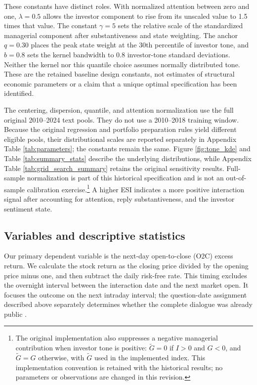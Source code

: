 \documentclass[12pt]{article}
\begin{document}
These constants have distinct roles. With normalized attention between zero and one, $\lambda=0.5$ allows the investor component to rise from its unscaled value to 1.5 times that value. The constant $\gamma=5$ sets the relative scale of the standardized managerial component after substantiveness and state weighting. The anchor $q=0.30$ places the peak state weight at the 30th percentile of investor tone, and $b=0.8$ sets the kernel bandwidth to 0.8 investor-tone standard deviations. Neither the kernel nor this quantile choice assumes normally distributed tone. These are the retained baseline design constants, not estimates of structural economic parameters or a claim that a unique optimal specification has been identified.

The centering, dispersion, quantile, and attention normalization use the full original 2010--2024 text pools. They do not use a 2010--2018 training window. Because the original regression and portfolio preparation rules yield different eligible pools, their distributional scales are reported separately in Appendix Table \ref{tab:parameters}; the constants remain the same. Figure \ref{fig:tone_kde} and Table \ref{tab:summary_stats} describe the underlying distributions, while Appendix Table \ref{tab:grid_search_summary} retains the original sensitivity results. Full-sample normalization is part of this historical specification and is not an out-of-sample calibration exercise.\footnote{The original implementation also suppresses a negative managerial contribution when investor tone is positive: $\widetilde G=0$ if $I>0$ and $G<0$, and $\widetilde G=G$ otherwise, with $\widetilde G$ used in the implemented index. This implementation convention is retained with the historical results; no parameters or observations are changed in this revision.}
 A higher ESI indicates a more positive interaction signal after accounting for attention, reply substantiveness, and the investor sentiment state.

\subsection{Variables and descriptive statistics}

Our primary dependent variable is the next-day open-to-close (O2C) excess return. We calculate the stock return as the closing price divided by the opening price minus one, and then subtract the daily risk-free rate. This timing excludes the overnight interval between the interaction date and the next market open. It focuses the outcome on the next intraday interval; the question-date assignment described above separately determines whether the complete dialogue was already public \citep{aboody2018,lopez2023chatgpt}.
\end{document}
